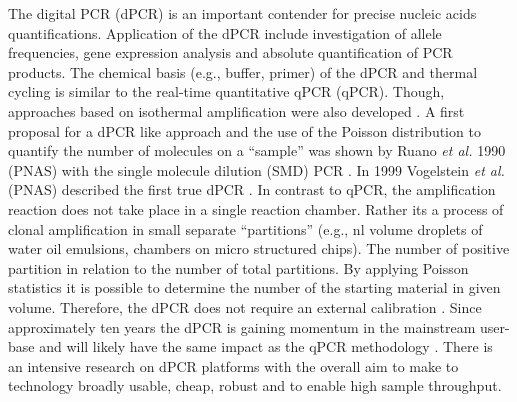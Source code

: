 \documentclass[a4,center,fleqn]{NAR}
\begin{document}
The digital PCR (dPCR) is an important contender for precise nucleic acids 
quantifications. Application of the dPCR include investigation of allele 
frequencies, gene expression analysis and absolute quantification of PCR 
products. The chemical basis (e.g., buffer, primer) of the dPCR and thermal 
cycling is similar to the real-time quantitative qPCR (qPCR). Though, approaches 
based on isothermal amplification were also developed 
\cite{pabinger_survey_2014, rodiger_r_2015}. A first proposal for a dPCR like 
approach and the use of the Poisson distribution to quantify the number of 
molecules on a ``sample'' was shown by Ruano \textit{et al.} 1990 (PNAS) with 
the single molecule dilution (SMD) PCR \cite{ruano_haplotype_1990}. In 1999 
Vogelstein \textit{et al.} (PNAS) described the first true dPCR 
\cite{vogelstein_digital_1999}. In contrast to qPCR, the amplification reaction 
does not take place in a single reaction chamber. Rather its a process of clonal 
amplification in small separate ``partitions'' (e.g., nl volume droplets of 
water oil emulsions, chambers on micro structured chips). The number of positive 
partition in relation to the number of total partitions. By applying Poisson 
statistics it is possible to determine the number of the starting material in 
given volume. Therefore, the dPCR does not require an external calibration 
\cite{selck_increased_2013, rodiger_r_2015}. Since approximately ten years the 
dPCR is gaining momentum in the mainstream user-base and will 
likely have the same impact as the qPCR methodology \cite{huggett_qpcr_2015, 
morley_digital_2014, rodiger_r_2015}. There is an intensive research on dPCR 
platforms with the overall aim to make to technology broadly usable, cheap, 
robust and to enable high sample throughput.

\enlargethispage{-65.1pt}
  
\end{document}
